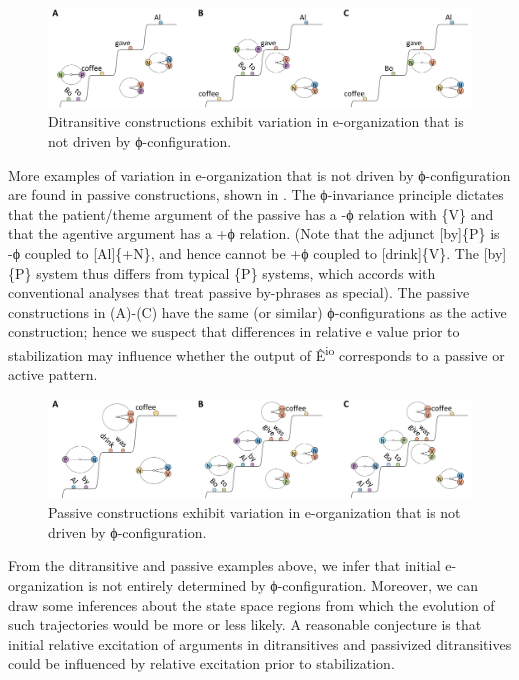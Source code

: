   
\begin{figure}
\includegraphics[width=\textwidth]{figures/Tilsen-img80.png}
\caption{Ditransitive constructions exhibit variation in e-organization that is not driven by ϕ-configuration.}
\label{fig:4:30}
\end{figure}
 

  More examples of variation in e-organization that is not driven by ϕ-configuration are found in passive constructions, shown in {}. The ϕ-invariance principle dictates that the patient/theme argument of the passive has a -ϕ relation with \{V\} and that the agentive argument has a +ϕ relation. (Note that the adjunct [by]\{P\} is -ϕ coupled to [Al]\{+N\}, and hence cannot be +ϕ coupled to [drink]\{V\}. The [by]\{P\} system thus differs from typical \{P\} systems, which accords with conventional analyses that treat passive by-phrases as special). The passive constructions in {}(A)-(C) have the same (or similar) ϕ-configurations as the active construction; hence we suspect that differences in relative e value prior to stabilization may influence whether the output of Ê\textsuperscript{io} corresponds to a passive or active pattern.

  
\begin{figure}
\includegraphics[width=\textwidth]{figures/Tilsen-img81.png}
\caption{Passive constructions exhibit variation in e-organization that is not driven by ϕ-configuration.}
\label{fig:4:31}
\end{figure}
 

  From the ditransitive and passive examples above, we infer that initial e-organization is not entirely determined by ϕ-configuration. Moreover, we can draw some inferences about the state space regions from which the evolution of such trajectories would be more or less likely. A reasonable conjecture is that initial relative excitation of arguments in ditransitives and passivized ditransitives could be influenced by relative excitation prior to stabilization.

